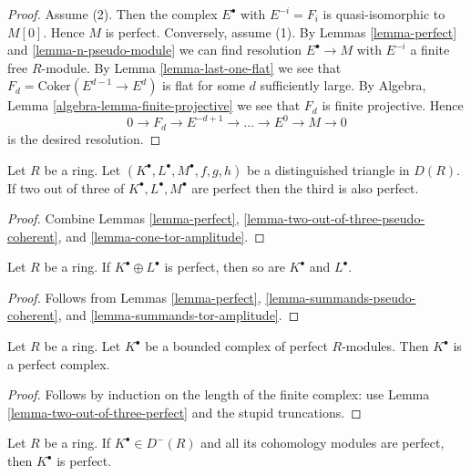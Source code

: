 \begin{proof}
Assume (2). Then the complex $E^\bullet$ with $E^{-i} = F_i$
is quasi-isomorphic to $M[0]$. Hence $M$ is perfect.
Conversely, assume (1). By
Lemmas \ref{lemma-perfect} and \ref{lemma-n-pseudo-module}
we can find resolution $E^\bullet \to M$ with $E^{-i}$ a finite free
$R$-module. By
Lemma \ref{lemma-last-one-flat}
we see that $F_d = \text{Coker}(E^{d - 1} \to E^d)$ is flat for
some $d$ sufficiently large. By
Algebra, Lemma \ref{algebra-lemma-finite-projective}
we see that $F_d$ is finite projective.
Hence
$$
0 \to F_d \to E^{-d+1} \to \ldots \to E^0 \to M \to 0
$$
is the desired resolution.
\end{proof}

\begin{lemma}
\label{lemma-two-out-of-three-perfect}
Let $R$ be a ring. Let $(K^\bullet, L^\bullet, M^\bullet, f, g, h)$
be a distinguished triangle in $D(R)$. If two out of three of
$K^\bullet, L^\bullet, M^\bullet$ are
perfect then the third is also perfect.
\end{lemma}

\begin{proof}
Combine
Lemmas \ref{lemma-perfect}, \ref{lemma-two-out-of-three-pseudo-coherent}, and
\ref{lemma-cone-tor-amplitude}.
\end{proof}

\begin{lemma}
\label{lemma-summands-perfect}
Let $R$ be a ring. If $K^\bullet \oplus L^\bullet$ is perfect, then
so are $K^\bullet$ and $L^\bullet$.
\end{lemma}

\begin{proof}
Follows from
Lemmas \ref{lemma-perfect}, \ref{lemma-summands-pseudo-coherent}, and
\ref{lemma-summands-tor-amplitude}.
\end{proof}

\begin{lemma}
\label{lemma-complex-perfect-modules}
Let $R$ be a ring. Let $K^\bullet$ be a bounded complex of perfect
$R$-modules. Then $K^\bullet$ is a perfect complex.
\end{lemma}

\begin{proof}
Follows by induction on the length of the finite complex: use
Lemma \ref{lemma-two-out-of-three-perfect}
and the stupid truncations.
\end{proof}

\begin{lemma}
\label{lemma-cohomology-perfect}
Let $R$ be a ring. If $K^\bullet \in D^{-}(R)$ and all its cohomology
modules are perfect, then $K^\bullet$ is perfect.
\end{lemma}

